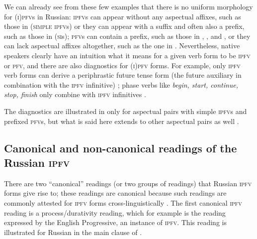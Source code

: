 \documentclass[output=paper]{langscibook}
\begin{document}
We can already see from these few examples that there is no uniform morpho\-logy for \textsc{(i)pfv}s in Russian: \textsc{ipfv}s can appear without any aspectual affixes, such as those in  (\textsc{simple} \textsc{ipfv}s) or they can appear with a suffix and often also a prefix, such as those in  (\textsc{si}s); \textsc{pfv}s can contain a prefix, such as those in , , and , or they can lack aspectual affixes altogether, such as the one in . Nevertheless, native speakers clearly have an intuition what it means for a given verb form to be \textsc{ipfv} or \textsc{pfv}, and there are also diagnostics for \textsc{(i)pfv} forms. For example, only \textsc{ipfv} verb forms can derive a periphrastic future tense form (the future auxiliary in combination with the \textsc{ipfv} infinitive) ; phase verbs like \textit{begin, start, continue, stop, finish} only combine with \textsc{ipfv} infinitives . 

\ea\label{gehr:ex:diagnostics}
\label{gehr:ex:diagnosticsa}			
\label{gehr:ex:diagnosticsb}
\z	
\z

\noindent The diagnostics are illustrated in  only for aspectual pairs with simple \textsc{ipfv}s and prefixed \textsc{pfv}s, but what is said here extends to other aspectual pairs as well \citep[see, e.g., the discussion in][]{isacenko62, borik02}.  

\subsection{Canonical and non-canonical readings of the Russian \textsc{ipfv}}

There are two ``canonical'' readings (or two groups of readings) that Russian \textsc{ipfv} forms give rise to; these readings are canonical because such readings are commonly attested for \textsc{ipfv} forms cross-linguistically \citep[see, e.g.,][]{deo09}. The first canonical \textsc{ipfv} reading is a process/durativity reading, which for example is the reading expressed by the English Progressive, an instance of \textsc{ipfv}. This reading is illustrated for Russian in the main clause of . 
\end{document}
